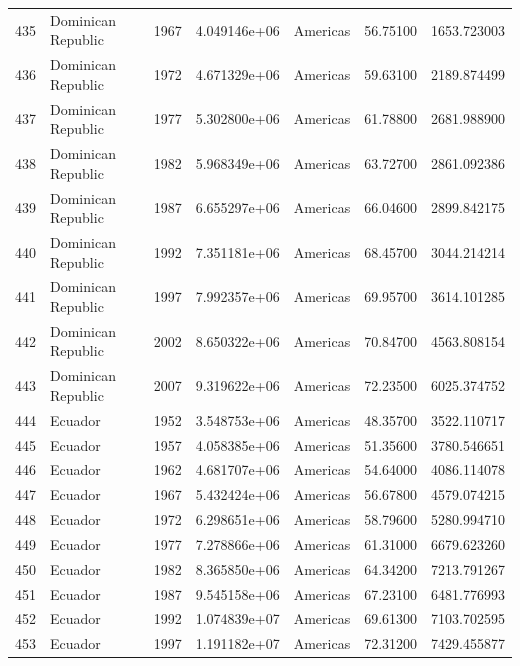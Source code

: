 \documentclass[
  letterpaper,
  DIV=11,
  numbers=noendperiod]{scrreprt}
\begin{document}
\begin{tabular}{llrrlrr}
435  &        Dominican Republic &  1967 &  4.049146e+06 &  Americas &  56.75100 &    1653.723003 \\
436  &        Dominican Republic &  1972 &  4.671329e+06 &  Americas &  59.63100 &    2189.874499 \\
437  &        Dominican Republic &  1977 &  5.302800e+06 &  Americas &  61.78800 &    2681.988900 \\
438  &        Dominican Republic &  1982 &  5.968349e+06 &  Americas &  63.72700 &    2861.092386 \\
439  &        Dominican Republic &  1987 &  6.655297e+06 &  Americas &  66.04600 &    2899.842175 \\
440  &        Dominican Republic &  1992 &  7.351181e+06 &  Americas &  68.45700 &    3044.214214 \\
441  &        Dominican Republic &  1997 &  7.992357e+06 &  Americas &  69.95700 &    3614.101285 \\
442  &        Dominican Republic &  2002 &  8.650322e+06 &  Americas &  70.84700 &    4563.808154 \\
443  &        Dominican Republic &  2007 &  9.319622e+06 &  Americas &  72.23500 &    6025.374752 \\
444  &                   Ecuador &  1952 &  3.548753e+06 &  Americas &  48.35700 &    3522.110717 \\
445  &                   Ecuador &  1957 &  4.058385e+06 &  Americas &  51.35600 &    3780.546651 \\
446  &                   Ecuador &  1962 &  4.681707e+06 &  Americas &  54.64000 &    4086.114078 \\
447  &                   Ecuador &  1967 &  5.432424e+06 &  Americas &  56.67800 &    4579.074215 \\
448  &                   Ecuador &  1972 &  6.298651e+06 &  Americas &  58.79600 &    5280.994710 \\
449  &                   Ecuador &  1977 &  7.278866e+06 &  Americas &  61.31000 &    6679.623260 \\
450  &                   Ecuador &  1982 &  8.365850e+06 &  Americas &  64.34200 &    7213.791267 \\
451  &                   Ecuador &  1987 &  9.545158e+06 &  Americas &  67.23100 &    6481.776993 \\
452  &                   Ecuador &  1992 &  1.074839e+07 &  Americas &  69.61300 &    7103.702595 \\
453  &                   Ecuador &  1997 &  1.191182e+07 &  Americas &  72.31200 &    7429.455877 \\

\end{tabular}
\end{document}
